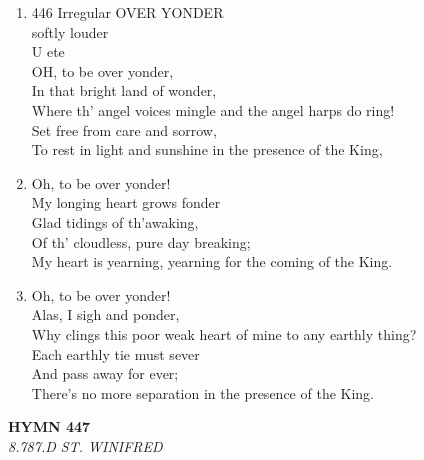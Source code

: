 \documentclass[11pt,a4paper]{article}
\begin{document}
\begin{enumerate}
    \item 446 Irregular OVER YONDER \\
        softly louder \\
        U ete \\
        OH, to be over yonder, \\
        In that bright land of wonder, \\
        Where th' angel voices mingle and the angel harps do ring! \\
        Set free from care and sorrow, \\
        To rest in light and sunshine in the presence of the King,

    \item Oh, to be over yonder! \\
        My longing heart grows fonder \\
        Glad tidings of th'awaking, \\
        Of th' cloudless, pure day breaking; \\
        My heart is yearning, yearning for the coming of the King.

    \item Oh, to be over yonder! \\
        Alas, I sigh and ponder, \\
        Why clings this poor weak heart of mine to any earthly thing? \\
        Each earthly tie must sever \\
        And pass away for ever; \\
        There's no more separation in the presence of the King.

\end{enumerate}

\newpage
\begin{center}
    {\Large \textbf{HYMN 447}}
    \\
    \textit{8.787.D ST. WINIFRED}
\end{center}
\vspace{1em}
\end{document}
